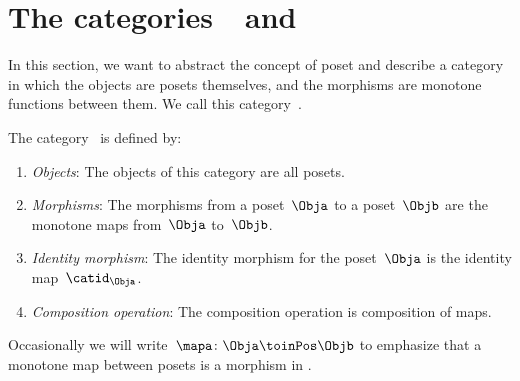 
\section[The categories \Pos and \Lat]{The categories~\Pos~and~\Lat}
\label{sec:category-Pos}
In this section, we want to abstract the concept of poset and describe a category in which the objects are posets themselves, and the morphisms are monotone functions between them.
We call this category~\Pos.

\begin{ctdefinition}
	\label{def:Pos}
	The category~\iindex{\Pos} is defined by:
	\begin{enumerate}
		\item \emph{Objects}: The objects of this category are all posets.
		\item \emph{Morphisms}: The morphisms from a poset~$\Obja$ to a poset~$\Objb$ are the monotone maps from~$\Obja$ to~$\Objb$.
		\item \emph{Identity morphism}: The identity morphism for the poset~$\Obja$
		      is the identity map~$\catid_\Obja$.
		\item \emph{Composition operation}: The composition operation is composition of maps.
	\end{enumerate}
\end{ctdefinition}

Occasionally we will write~$\mapa \colon \Obja \toinPos \Objb$ to emphasize that a monotone map between posets is a morphism in \Pos.

